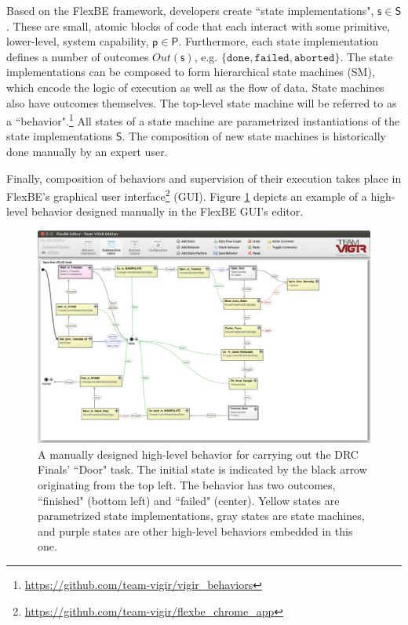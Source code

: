 Based on the FlexBE framework, developers create ``state implementations", $\mathsf{s} \in \mathsf{S}$.
These are small, atomic blocks of code that each interact with some primitive, lower-level, system capability, $\mathsf{p} \in \mathsf{P}$.
Furthermore, each state implementation defines a number of outcomes $Out(\mathsf{s})$, e.g. $\{ \mathtt{done}, \mathtt{failed}, \mathtt{aborted} \}$.
The state implementations can be composed to form hierarchical state machines (SM), which encode the logic of execution as well as the flow of data.
State machines also have outcomes themselves.
The top-level state machine will be referred to as a ``behavior".\footnote{\scriptsize{\url{https://github.com/team-vigir/vigir_behaviors}}}
All states of a state machine are parametrized instantiations of the state implementations $\mathsf{S}$.
The composition of new state machines is historically done manually by an expert user.

Finally, composition of behaviors and supervision of their execution takes place in FlexBE's graphical user interface\footnote{\scriptsize{\url{https://github.com/team-vigir/flexbe_chrome_app}}} (GUI).
Figure \ref{Fig:FlexBESM} depicts an example of a high-level behavior designed manually in the FlexBE GUI's editor.

\begin{figure}[t]
\centering
\includegraphics[width=0.99\columnwidth,clip]{./img/behavior_open_door.png}
\caption{A manually designed high-level behavior for carrying out the DRC Finals' ``Door" task.
The initial state is indicated by the black arrow originating from the top left.
The behavior has two outcomes, ``finished" (bottom left) and ``failed" (center).
Yellow states are parametrized state implementations, gray states are state machines, and purple states are other high-level behaviors embedded in this one.
}
\label{Fig:FlexBESM}
\end{figure}


